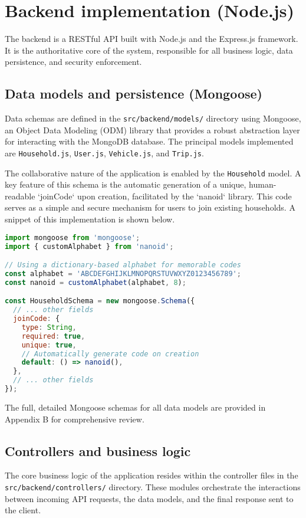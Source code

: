 \section{Backend implementation (Node.js)}

The backend is a RESTful API built with Node.js and the Express.js framework. It is the authoritative core of the system, responsible for all business logic, data persistence, and security enforcement.

\subsection{Data models and persistence (Mongoose)}
Data schemas are defined in the \texttt{src/backend/models/} directory using Mongoose, an Object Data Modeling (ODM) library that provides a robust abstraction layer for interacting with the MongoDB database. The principal models implemented are \texttt{Household.js}, \texttt{User.js}, \texttt{Vehicle.js}, and \texttt{Trip.js}.

\textgap

The collaborative nature of the application is enabled by the \texttt{Household} model. A key feature of this schema is the automatic generation of a unique, human-readable `joinCode` upon creation, facilitated by the `nanoid` library. This code serves as a simple and secure mechanism for users to join existing households. A snippet of this implementation is shown below.

\begin{lstlisting}[language=JavaScript, caption={Join Code Generation in \texttt{models/Household.js}}]
import mongoose from 'mongoose';
import { customAlphabet } from 'nanoid';

// Using a dictionary-based alphabet for memorable codes
const alphabet = 'ABCDEFGHIJKLMNOPQRSTUVWXYZ0123456789';
const nanoid = customAlphabet(alphabet, 8);

const HouseholdSchema = new mongoose.Schema({
  // ... other fields
  joinCode: {
    type: String,
    required: true,
    unique: true,
    // Automatically generate code on creation
    default: () => nanoid(),
  },
  // ... other fields
});
\end{lstlisting}
The full, detailed Mongoose schemas for all data models are provided in Appendix B for comprehensive review.

\subsection{Controllers and business logic}
The core business logic of the application resides within the controller files in the \texttt{src/backend/controllers/} directory. These modules orchestrate the interactions between incoming API requests, the data models, and the final response sent to the client.

